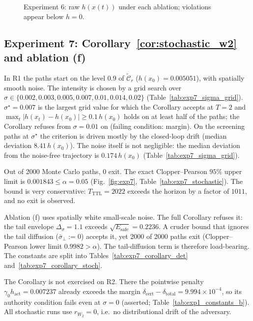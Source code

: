 \begin{figure}[t]\centering{}
\caption{Experiment 6: raw \(h(x(t))\) under each ablation; violations appear below \(h=0\).}\label{fig:exp6}\end{figure}



\subsection{Experiment 7: Corollary~\ref{cor:stochastic_w2} and ablation (f)}
In R1 the paths start on the level \(0.9\) of \(\tilde{\mathcal C}_r\) (\(h(x_0) = 0.005051\)), with spatially smooth
noise. The intensity is chosen by a grid search over \(\sigma \in \{0.002, 0.003, 0.005, 0.007, 0.01, 0.014, 0.02\}\) (Table~\ref{tab:exp7_sigma_grid}).
\(\sigma^\star = 0.007\) is the largest grid value for which the Corollary accepts at \(T = 2\) and
\(\max_t|h(x_t) - h(x_0)| \ge 0.1\,h(x_0)\) holds on at least half of the paths; the Corollary refuses from
\(\sigma = 0.01\) on (failing condition: margin). On the screening paths at \(\sigma^\star\) the criterion is driven mostly by the closed-loop drift (median
deviation \(8.41\,h(x_0)\)). The noise itself is not negligible: the median deviation from the noise-free
trajectory is \(0.174\,h(x_0)\) (Table~\ref{tab:exp7_sigma_grid}).

Out of 2000 Monte Carlo paths, 0 exit. The exact Clopper--Pearson \(95\%\) upper limit is
\(0.001843 \le \alpha = 0.05\) (Fig.~\ref{fig:exp7}, Table~\ref{tab:exp7_stochastic}). The bound is very
conservative: \(T_{\mathrm{TTL}} = 2022\) exceeds the horizon by a factor of \(1011\), and no exit is
observed.

Ablation (f) uses spatially white small-scale noise. The full Corollary refuses it: the tail envelope
\(\Delta_\sigma = 1.1\) exceeds \(\sqrt{E_{\mathrm{safe}}} = 0.2236\). A cruder bound that ignores the tail
diffusion (\(\bar\sigma_\perp := 0\)) accepts it, yet 2000 of 2000 paths exit (Clopper--Pearson lower
limit \(0.9982 > \alpha\)). The tail-diffusion term is therefore load-bearing. The constants are split into
Tables~\ref{tab:exp7_corollary_det} and~\ref{tab:exp7_corollary_stoch}.

The Corollary is not exercised on R2. There the pointwise penalty \(\gamma_0h_{\mathrm{act}} = 0.007237\)
already exceeds the margin \(\delta_{\mathrm{cert}} - \delta_{\mathrm{total}} = 9.994\times10^{-4}\), so its authority condition
fails even at \(\sigma = 0\) (asserted; Table~\ref{tab:exp1_constants_b}). All stochastic runs use \(r_{W_{\scriptstyle 2}} = 0\),
i.e.\ no distributional drift of the adversary.

